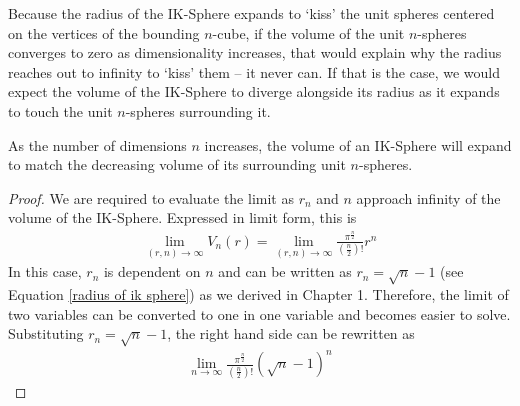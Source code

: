 Because the radius of the IK-Sphere expands to `kiss' the unit spheres centered on the vertices of the bounding $n$-cube, if the volume of the unit $n$-spheres converges to zero as dimensionality increases, that would explain why the radius reaches out to infinity to `kiss' them -- it never can. If that is the case, we would expect the volume of the IK-Sphere to diverge alongside its radius as it expands to touch the unit $n$-spheres surrounding it.

\begin{theorem}
As the number of dimensions $n$ increases, the volume of an IK-Sphere will expand to match the decreasing volume of its surrounding unit $n$-spheres. 
\end{theorem}

\begin{proof}
    We are required to evaluate the limit as $r_n$ and $n$ approach infinity of the volume of the IK-Sphere. Expressed in limit form, this is
    \begin{align*}
        \lim_{(r,n)\to\infty}V_n(r)=\lim_{(r,n)\to\infty}\frac{\pi^{\frac{n}{2}}}{\left(\frac{n}{2}\right)!}r^n
    \end{align*}
    In this case, $r_n$ is dependent on $n$ and can be written as $r_n=\sqrt{n}-1$ (see Equation \ref{radius of ik sphere}) as we derived in Chapter 1. Therefore, the limit of two variables can be converted to one in one variable and becomes easier to solve. Substituting $r_n=\sqrt{n}-1$, the right hand side can be rewritten as
    \begin{align*}
        \lim_{n\to\infty}\frac{\pi^{\frac{n}{2}}}{\left(\frac{n}{2}\right)!}{\left(\sqrt{n}-1\right)}^n
    \end{align*}
    
    
    
\end{proof}